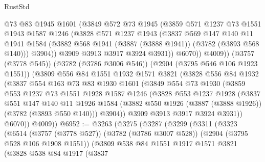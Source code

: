 \begin{lexlean}{RustStd}
\begin{coremodule}
              @73
              @83
              @1945
              @1601
              (@3849
                @572
                @73
                @1945
                (@3859
                  @571
                  @1237
                  @73
                  @1551
                  @1943
                  @1587
                  @1246
                  (@3828
                    @571
                    @1237
                    @1943
                    (@3837
                      @569
                      @147
                      @140
                      @11
                      @1941
                      @1584
                      (@3882 @568 @1941 (@3887 (@3888 @1941)) (@3782 (@3893 @568 @140)))
                      @3904))
                  @3909
                  @3913
                  @3917
                  @3924
                  @3931))
              @6070))
          @4009))
      (@3757 (@3778 @545))
      (@3782 (@3786 @3006 @546))
      (@2904 (@3795 @546 @106 @1923 @1551))
      (@3809
        @556
        @84
        @1551
        @1932
        @1571
        @3821
        (@3828
          @556
          @84
          @1932
          (@3837
            @554
            @163
            @73
            @83
            @1930
            @1601
            (@3849
              @554
              @73
              @1930
              (@3859
                @553
                @1237
                @73
                @1551
                @1928
                @1587
                @1246
                (@3828
                  @553
                  @1237
                  @1928
                  (@3837
                    @551
                    @147
                    @140
                    @11
                    @1926
                    @1584
                    (@3882 @550 @1926 (@3887 (@3888 @1926)) (@3782 (@3893 @550 @140)))
                    @3904))
                @3909
                @3913
                @3917
                @3924
                @3931))
            @6070))
        @4009))
@6952 := @3263
    (@3275
      (@3287
        (@3299
          (@3311
            (@3323
              (@6514
                (@3757 (@3778 @527))
                (@3782 (@3786 @3007 @528))
                (@2904 (@3795 @528 @106 @1908 @1551))
                (@3809
                  @538
                  @84
                  @1551
                  @1917
                  @1571
                  @3821
                  (@3828
                    @538
                    @84
                    @1917
                    (@3837

\end{coremodule}
\end{lexlean}
